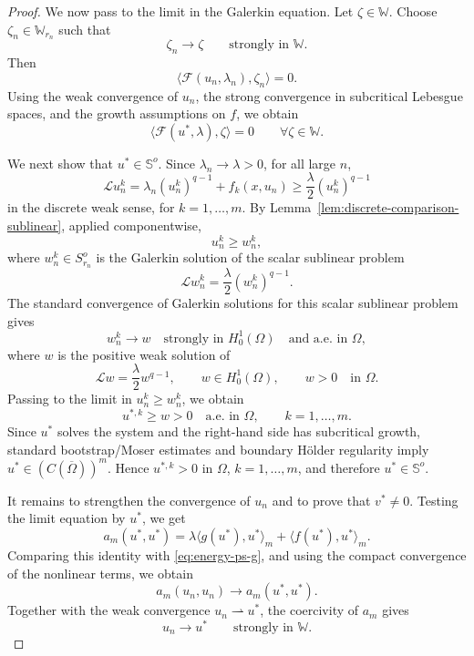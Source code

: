 \documentclass[preprint,10pt]{elsarticle}
\numberwithin{equation}{section}
\begin{document}
\begin{proof}
	We now pass to the limit in the Galerkin equation. Let
	\(\zeta\in\mathbb W\). Choose \(\zeta_n\in\mathbb W_{r_n}\) such that
	\[
	\zeta_n\to\zeta
	\qquad\text{strongly in }\mathbb W .
	\]
	Then
	\[
	\langle\mathcal F(u_n,\lambda_n),\zeta_n\rangle=0.
	\]
	Using the weak convergence of \(u_n\), the strong convergence in
	subcritical Lebesgue spaces, and the growth assumptions on \(f\), we obtain
	\[
	\langle\mathcal F(u^*,\lambda),\zeta\rangle=0
	\qquad \forall \zeta\in\mathbb W .
	\]
	
	We next show that \(u^*\in\mathbb S^o\). Since
	\(\lambda_n\to\lambda>0\), for all large \(n\),
	\[
	\mathcal L u_n^k
	=
	\lambda_n(u_n^k)^{q-1}+f_k(x,u_n)
	\ge
	\frac{\lambda}{2}(u_n^k)^{q-1}
	\]
	in the discrete weak sense, for \(k=1,\ldots,m\). By
	Lemma~\ref{lem:discrete-comparison-sublinear}, applied componentwise,
	\[
	u_n^k\ge w_n^k,
	\]
	where \(w_n^k\in S_{r_n}^o\) is the Galerkin solution of the scalar
	sublinear problem
	\[
	\mathcal L w_n^k=\frac{\lambda}{2}(w_n^k)^{q-1}.
	\]
	The standard convergence of Galerkin solutions for this scalar sublinear
	problem gives
	\[
	w_n^k\to w
	\quad\text{strongly in }H_0^1(\Omega)
	\quad\text{and a.e. in }\Omega,
	\]
	where \(w\) is the positive weak solution of
	\[
	\mathcal L w=\frac{\lambda}{2}w^{q-1},
	\qquad
	w\in H_0^1(\Omega),
	\qquad
	w>0 \quad\text{in }\Omega .
	\]
	Passing to the limit in \(u_n^k\ge w_n^k\), we obtain
	\[
	u^{*,k}\ge w>0
	\quad\text{a.e. in }\Omega,
	\qquad k=1,\ldots,m .
	\]
	Since \(u^*\) solves the system and the right-hand side has subcritical
	growth, standard bootstrap/Moser estimates and boundary H\"older regularity
	imply \(u^*\in(C(\overline\Omega))^m\). Hence
	\(u^{*,k}>0\) in \(\Omega\), \(k=1,\ldots,m\), and therefore
	\(u^*\in\mathbb S^o\).
	
	It remains to strengthen the convergence of \(u_n\) and to prove that
	\(v^*\ne0\). Testing the limit equation by \(u^*\), we get
	\[
	a_m(u^*,u^*)
	=
	\lambda\langle g(u^*),u^*\rangle_m
	+
	\langle f(u^*),u^*\rangle_m .
	\]
	Comparing this identity with \eqref{eq:energy-ps-g}, and using the compact
	convergence of the nonlinear terms, we obtain
	\[
	a_m(u_n,u_n)\to a_m(u^*,u^*) .
	\]
	Together with the weak convergence \(u_n\rightharpoonup u^*\), the
	coercivity of \(a_m\) gives
	\[
	u_n\to u^*
	\qquad\text{strongly in }\mathbb W .
	\]
	

\end{proof}
\end{document}
